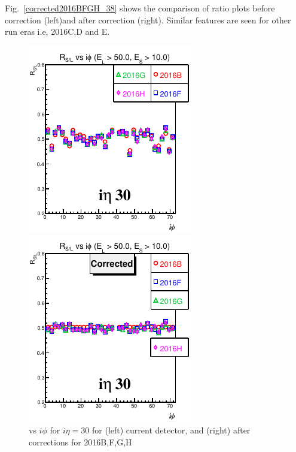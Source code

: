 Fig.~\ref{corrected2016BFGH_38} shows the comparison of ratio plots before correction (left)and after correction (right). Similar features are seen for other run eras i.e, 2016C,D and E. %

\begin{figure}[!h] %
\begin{minipage}[c]{0.5\linewidth}
\centering
\includegraphics[width=0.7\linewidth]{../Figures/Chap2/ImageFiles_HF/Ratio/2016/Corrected/ieta30Cut3Ietaiphi.pdf}
\end{minipage}
\begin{minipage}[c]{0.5\linewidth}
\centering
\includegraphics[width=0.7\linewidth]{../Figures/Chap2/ImageFiles_HF/Ratio/2016/Corrected/ieta30Cut3Ietaiphi_corr.pdf}
\end{minipage}
\caption[\ratiosl vs $i\phi$ for $i\eta=30$ before and after corrections]{\ratiosl vs $i\phi$ for $i\eta=30$ for (left) current detector, and (right) after corrections for 2016B,F,G,H}
\label{corrected2016BFGH_30}
\end{figure}

